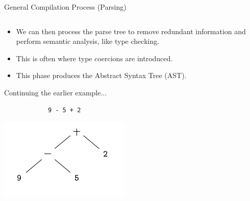 \documentclass{beamer}
\begin{document}
\begin{frame}[fragile]{General Compilation Process (Parsing)}
\begin{columns}[T,onlytextwidth]
        \begin{overprint}
            \begin{itemize}
                \item We can then process the parse tree to remove redundant information and perform semantic analysis, like type checking.
                \item This is often where type coercions are introduced.
                \item This phase produces the Abstract Syntax Tree (AST).
            \end{itemize}

            Continuing the earlier example...
            \begin{lstlisting}
            9 - 5 + 2
            \end{lstlisting}

            \includegraphics[width=\textwidth]{images/ast.png}
        \end{overprint}


\end{columns}
\end{frame}
\end{document}
